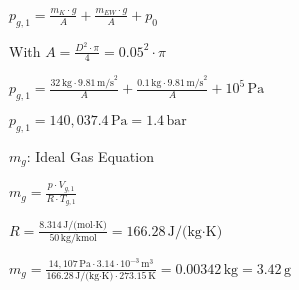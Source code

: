 \( p_{g,1} = \frac{m_{K} \cdot g}{A} + \frac{m_{EW} \cdot g}{A} + p_{0} \)  

With \( A = \frac{D^2 \cdot \pi}{4} = 0.05^2 \cdot \pi \)  

\( p_{g,1} = \frac{32 \, \text{kg} \cdot 9.81 \, \text{m/s}^2}{A} + \frac{0.1 \, \text{kg} \cdot 9.81 \, \text{m/s}^2}{A} + 10^5 \, \text{Pa} \)  

\( p_{g,1} = 140,037.4 \, \text{Pa} = 1.4 \, \text{bar} \)  

\( m_{g} \): Ideal Gas Equation  

\( m_{g} = \frac{p \cdot V_{g,1}}{R \cdot T_{g,1}} \)  

\( R = \frac{8.314 \, \text{J/(mol·K)}}{50 \, \text{kg/kmol}} = 166.28 \, \text{J/(kg·K)} \)  

\( m_{g} = \frac{14,107 \, \text{Pa} \cdot 3.14 \cdot 10^{-3} \, \text{m}^3}{166.28 \, \text{J/(kg·K)} \cdot 273.15 \, \text{K}} = 0.00342 \, \text{kg} = 3.42 \, \text{g} \)